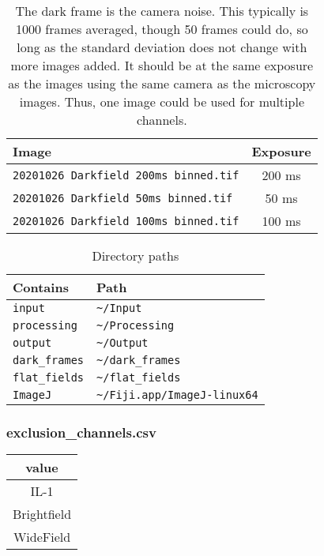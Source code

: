 \begin{table}[htb]
  \centering
  \caption{The dark frame is the camera noise. This typically is 1000 frames averaged, though 50 frames could do, so long as the standard deviation does not change with more images added. It should be at the same exposure as the images using the same camera as the microscopy images. Thus, one image could be used for multiple channels.}
  \label{tab:dark\_frames}
  \begin{tabular}{ | l | c | }
    \hline
    \textbf{Image} & \textbf{Exposure} \\ \hline
    \texttt{20201026 Darkfield 200ms binned.tif} & 200 ms \\ \hline
    \texttt{20201026 Darkfield 50ms binned.tif} & 50 ms \\ \hline
    \texttt{20201026 Darkfield 100ms binned.tif} & 100 ms \\ \hline
  \end{tabular}
\end{table}

\begin{table}[htb]
  \centering
  \caption{Directory paths}
  \label{tab:directories}
  \begin{tabular}{ | l | p{10cm} | }
    \hline
    \textbf{Contains} & \textbf{Path} \\ \hline
    \texttt{input} & \texttt{\textasciitilde/Input} \\ \hline
    \texttt{processing} & \texttt{\textasciitilde/Processing} \\ \hline
    \texttt{output} & \texttt{\textasciitilde/Output} \\ \hline
    \texttt{dark\_frames} & \texttt{\textasciitilde/dark\_frames} \\ \hline
    \texttt{flat\_fields} & \texttt{\textasciitilde/flat\_fields} \\ \hline
    \texttt{ImageJ} & \texttt{\textasciitilde/Fiji.app/ImageJ-linux64} \\ \hline
  \end{tabular}
\end{table}


\subsubsection*{exclusion\_channels.csv}
\begin{tabular}{|c|}
    \hline
    value \\
    \hline
    IL-1 \\
    Brightfield \\
    WideField \\
    \hline
\end{tabular}


